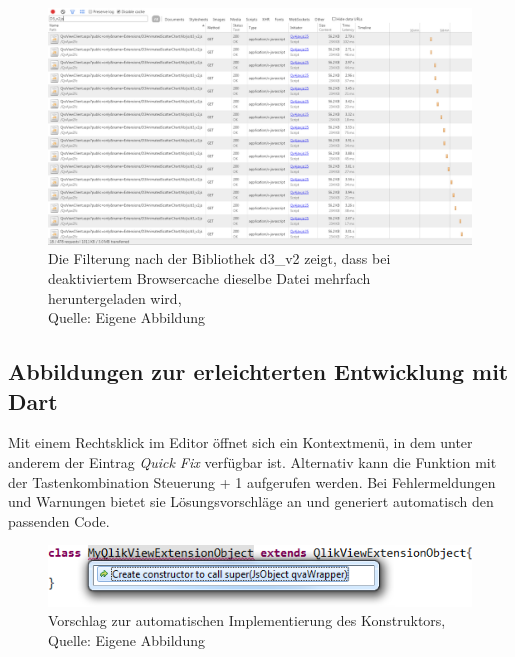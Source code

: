 \begin{appendix}
\ifIncludeFigures\begin{figure}[htbp]
	\centering
		\includegraphics[width=1.00\textwidth]{img/headRudundant/Sources.png}
	\caption[Mehrfaches Herunterladen derselben Datei.]{Die Filterung nach der Bibliothek d3\_v2 zeigt, dass bei deaktiviertem Browsercache dieselbe Datei mehrfach heruntergeladen wird, \\Quelle: Eigene Abbildung}
	\label{fig:Sources}
\end{figure}\fi


\newpage
\subsection{Abbildungen zur erleichterten Entwicklung mit Dart} 
\label{lab:AbbildungenZurErleichtertenEntwicklungVonErweiterungenMitDart}

Mit einem Rechtsklick im Editor öffnet sich ein Kontextmenü, in dem unter anderem der Eintrag \textit{Quick Fix} verfügbar ist. Alternativ kann die Funktion mit der Tastenkombination Steuerung + 1 aufgerufen werden. Bei Fehlermeldungen und Warnungen bietet sie Lösungsvorschläge an und generiert automatisch den passenden Code.

\ifIncludeFigures\begin{figure}[htbp]
	\centering
		\includegraphics[width=1.00\textwidth]{img/HilfeDurchEditor/implConstr.png}
	\caption[Vorschlag zur automatischen Implementierung des Konstruktors]{Vorschlag zur automatischen Implementierung des Konstruktors, \\Quelle: Eigene Abbildung}
	\label{fig:implConstr}
\end{figure}\fi


\end{appendix}
